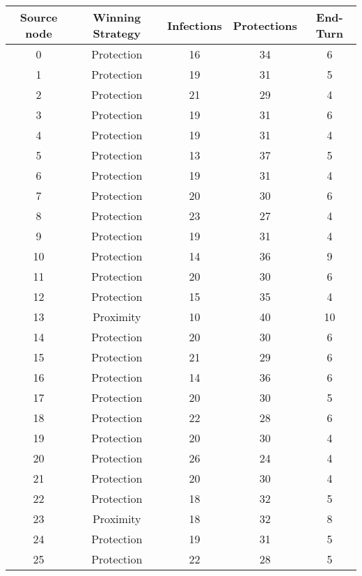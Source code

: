 \documentclass[results.tex]{subfiles}
\begin{document}
\begin{center}
  \begin{tabular}{| c || c | c | c | c |}
    \hline
    {\bfseries Source node} & {\bfseries Winning Strategy} & {\bfseries Infections} & {\bfseries Protections} & {\bfseries End-Turn} \\  %
    \hline\hline
    0 & Protection & 16 & 34 & 6 \\ 
    \hline
    1 & Protection & 19 & 31 & 5 \\ 
    \hline
    2 & Protection & 21 & 29 & 4 \\ 
    \hline
    3 & Protection & 19 & 31 & 6 \\ 
    \hline
    4 & Protection & 19 & 31 & 4 \\ 
    \hline
    5 & Protection & 13 & 37 & 5 \\ 
    \hline
    6 & Protection & 19 & 31 & 4 \\ 
    \hline
    7 & Protection & 20 & 30 & 6 \\ 
    \hline
    8 & Protection & 23 & 27 & 4 \\ 
    \hline
    9 & Protection & 19 & 31 & 4 \\ 
    \hline
    10 & Protection & 14 & 36 & 9 \\ 
    \hline
    11 & Protection & 20 & 30 & 6 \\ 
    \hline
    12 & Protection & 15 & 35 & 4 \\ 
    \hline
    13 & Proximity & 10 & 40 & 10 \\ 
    \hline
    14 & Protection & 20 & 30 & 6 \\ 
    \hline
    15 & Protection & 21 & 29 & 6 \\ 
    \hline
    16 & Protection & 14 & 36 & 6 \\ 
    \hline
    17 & Protection & 20 & 30 & 5 \\ 
    \hline
    18 & Protection & 22 & 28 & 6 \\ 
    \hline
    19 & Protection & 20 & 30 & 4 \\ 
    \hline
    20 & Protection & 26 & 24 & 4 \\ 
    \hline
    21 & Protection & 20 & 30 & 4 \\ 
    \hline
    22 & Protection & 18 & 32 & 5 \\ 
    \hline
    23 & Proximity & 18 & 32 & 8 \\ 
    \hline
    24 & Protection & 19 & 31 & 5 \\ 
    \hline
    25 & Protection & 22 & 28 & 5 \\ 

\end{tabular}
\end{center}
\end{document}
